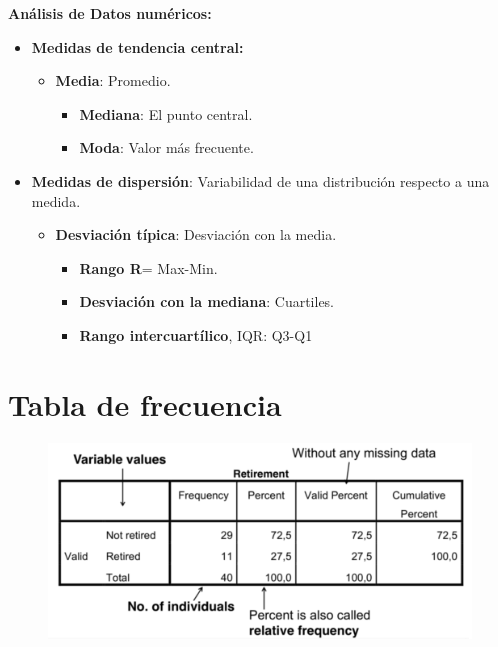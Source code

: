 \documentclass[12pt]{report} %
\begin{document}
\textbf{Análisis de Datos numéricos:}

\begin{itemize}

\item
  \textbf{Medidas de tendencia central:}

  \begin{itemize}
  
  \item
    \textbf{Media}: Promedio.

    \begin{itemize}
    
    \item
      \textbf{Mediana}: El punto central.
    \item
      \textbf{Moda}: Valor más frecuente.
    \end{itemize}
  \end{itemize}
\item
  \textbf{Medidas de dispersión}: Variabilidad de una distribución
  respecto a una medida.

  \begin{itemize}
  
  \item
    \textbf{Desviación típica}: Desviación con la media.

    \begin{itemize}
    
    \item
      \textbf{Rango R}= Max-Min.
    \item
      \textbf{Desviación con la mediana}: Cuartiles.
    \item
      \textbf{Rango intercuartílico}, IQR: Q3-Q1
    \end{itemize}
  \end{itemize}
\end{itemize}

\section{Tabla de frecuencia}

\begin{figure}[H]
	{\includegraphics[scale=.5]{Untitled 3.png}}
\end{figure}
\end{document}

